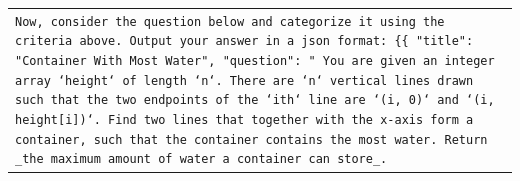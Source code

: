 \begin{table}[!th]
\begin{tabular}{>{\raggedright\arraybackslash\tt}p{}<{}}
Now, consider the question below and categorize it using the criteria above. Output your answer in a json format:\newline%
\{\{\newline%
    "title": "{\color{blue}Container With Most Water}",\newline%
    "question": "{\color{blue} You are given an integer array `height` of length `n`. There are `n` vertical lines drawn such that the two endpoints of the `ith` line are `(i, 0)` and `(i, height{[}i{]})`.\newline%
    \newline%
    Find two lines that together with the x{-}axis form a container, such that the container contains the most water.\newline%
    \newline%
    Return \_the maximum amount of water a container can store\_.\newline%
}
\end{tabular}
\end{table}

